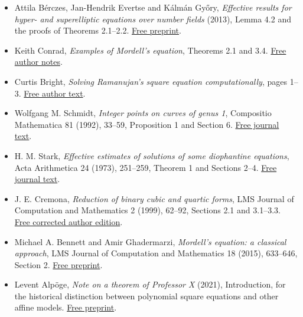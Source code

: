 \documentclass[
  11pt,
  a4paper,
]{article}
\providecommand{\tightlist}{%
  \setlength{\itemsep}{0pt}\setlength{\parskip}{0pt}}
\begin{document}
\begin{itemize}
\tightlist
\item
  Attila Bérczes, Jan-Hendrik Evertse and Kálmán Győry, \emph{Effective
  results for hyper- and superelliptic equations over number fields}
  (2013), Lemma 4.2 and the proofs of Theorems 2.1--2.2.
  \href{https://arxiv.org/abs/1301.7168}{Free preprint}.
\item
  Keith Conrad, \emph{Examples of Mordell's equation}, Theorems 2.1 and
  3.4.
  \href{https://kconrad.math.uconn.edu/blurbs/gradnumthy/mordelleqn1.pdf}{Free
  author notes}.
\item
  Curtis Bright, \emph{Solving Ramanujan's square equation
  computationally}, pages 1--3.
  \href{https://cs.uwaterloo.ca/~cbright/nsra/ramanujans-square-equation.pdf}{Free
  author text}.
\item
  Wolfgang M. Schmidt, \emph{Integer points on curves of genus 1},
  Compositio Mathematica 81 (1992), 33--59, Proposition 1 and Section 6.
  \href{https://www.numdam.org/item/CM_1992__81_1_33_0.pdf}{Free journal
  text}.
\item
  H. M. Stark, \emph{Effective estimates of solutions of some
  diophantine equations}, Acta Arithmetica 24 (1973), 251--259, Theorem
  1 and Sections 2--4.
  \href{https://www.impan.pl/shop/en/publication/transaction/download/product/98735}{Free
  journal text}.
\item
  J. E. Cremona, \emph{Reduction of binary cubic and quartic forms}, LMS
  Journal of Computation and Mathematics 2 (1999), 62--92, Sections 2.1
  and 3.1--3.3.
  \href{https://johncremona.github.io/papers/r34jcm.pdf}{Free corrected
  author edition}.
\item
  Michael A. Bennett and Amir Ghadermarzi, \emph{Mordell's equation: a
  classical approach}, LMS Journal of Computation and Mathematics 18
  (2015), 633--646, Section 2.
  \href{https://arxiv.org/abs/1311.7077}{Free preprint}.
\item
  Levent Alpöge, \emph{Note on a theorem of Professor X} (2021),
  Introduction, for the historical distinction between polynomial square
  equations and other affine models.
  \href{https://arxiv.org/abs/2109.14328}{Free preprint}.
\end{itemize}
\end{document}
